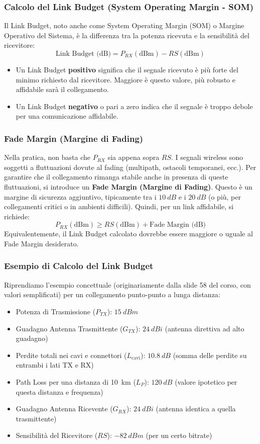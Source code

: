 \subsubsection{Calcolo del Link Budget (System Operating Margin - SOM)}
Il Link Budget, noto anche come System Operating Margin (SOM) o Margine Operativo del Sistema, è la differenza tra la potenza ricevuta e la sensibilità del ricevitore:
\[ \text{Link Budget (dB)} = P_{RX} (\text{dBm}) - RS (\text{dBm}) \]
\begin{itemize}
    \item Un Link Budget \textbf{positivo} significa che il segnale ricevuto è più forte del minimo richiesto dal ricevitore. Maggiore è questo valore, più robusto e affidabile sarà il collegamento.
    \item Un Link Budget \textbf{negativo} o pari a zero indica che il segnale è troppo debole per una comunicazione affidabile.
\end{itemize}

\subsubsection{Fade Margin (Margine di Fading)}
Nella pratica, non basta che $P_{RX}$ sia appena sopra $RS$. I segnali wireless sono soggetti a fluttuazioni dovute al fading (multipath, ostacoli temporanei, ecc.). Per garantire che il collegamento rimanga stabile anche in presenza di queste fluttuazioni, si introduce un \textbf{Fade Margin (Margine di Fading)}.
Questo è un margine di sicurezza aggiuntivo, tipicamente tra i $\SI{10}{dB}$ e i $\SI{20}{dB}$ (o più, per collegamenti critici o in ambienti difficili).
Quindi, per un link affidabile, si richiede:
\[ P_{RX} (\text{dBm}) \ge RS (\text{dBm}) + \text{Fade Margin (dB)} \]
Equivalentemente, il Link Budget calcolato dovrebbe essere maggiore o uguale al Fade Margin desiderato.

\subsubsection{Esempio di Calcolo del Link Budget}
Riprendiamo l'esempio concettuale (originariamente dalla slide 58 del corso, con valori semplificati) per un collegamento punto-punto a lunga distanza:
\begin{itemize}
    \item Potenza di Trasmissione ($P_{TX}$): $\SI{+15}{dBm}$
    \item Guadagno Antenna Trasmittente ($G_{TX}$): $\SI{+24}{dBi}$ (antenna direttiva ad alto guadagno)
    \item Perdite totali nei cavi e connettori ($L_{\text{cavi}}$): $\SI{10.8}{dB}$ (somma delle perdite su entrambi i lati TX e RX)
    \item Path Loss per una distanza di \SI{10}{km} ($L_P$): $\SI{120}{dB}$ (valore ipotetico per questa distanza e frequenza)
    \item Guadagno Antenna Ricevente ($G_{RX}$): $\SI{+24}{dBi}$ (antenna identica a quella trasmittente)
    \item Sensibilità del Ricevitore ($RS$): $\SI{-82}{dBm}$ (per un certo bitrate)
\end{itemize}

